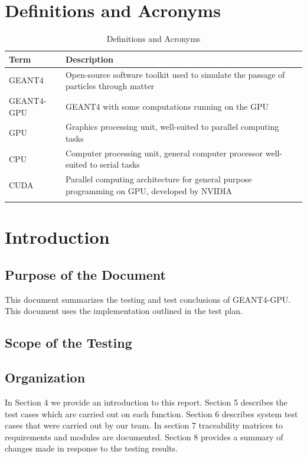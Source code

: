 \documentclass[12pt]{article}
\begin{document}
\section*{Definitions and Acronyms} %
\begin{table}[h]
\centering
\caption{Definitions and Acronyms}\label{Table_DefAndAcro}
\begin{tabularx}{\textwidth}{lX}
\toprule
\bf Term & \bf Description\\\midrule
GEANT4 & Open-source software toolkit used to simulate the passage of particles through matter\\
GEANT4-GPU & GEANT4 with some computations running on the GPU\\
GPU & Graphics processing unit, well-suited to parallel computing tasks\\
CPU & Computer processing unit, general computer processor well-suited to serial tasks\\
CUDA & Parallel computing architecture for general purpose programming on GPU, developed by NVIDIA\\
\Xhline{2\arrayrulewidth}
\end{tabularx}
\end{table}


\section{Introduction}
\subsection{Purpose of the Document}
This document summarizes the testing and test conclusions of GEANT4-GPU. This document uses the implementation outlined in the test plan.
\subsection{Scope of the Testing}
\subsection{Organization}
In Section 4 we provide an introduction to this report. Section 5 describes the test cases which are carried out on each function. Section 6 describes system test cases that were carried out by our team. In section 7 traceability matrices to requirements and modules are documented. Section 8 provides a summary of changes made in response to the testing results.
\end{document}
